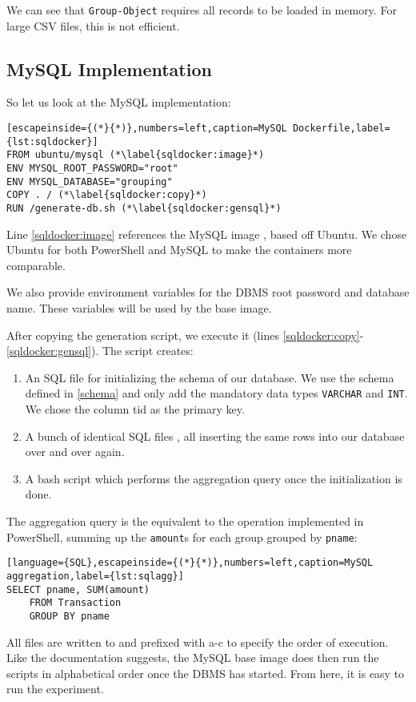 We can see that \verb+Group-Object+ requires all records
to be loaded in memory. For large \gls{CSV} files, this is not efficient.

\subsection{MySQL Implementation}

So let us look at the \gls{MySQL} implementation:

\begin{lstlisting}[escapeinside={(*}{*)},numbers=left,caption=MySQL Dockerfile,label={lst:sqldocker}]
FROM ubuntu/mysql (*\label{sqldocker:image}*)
ENV MYSQL_ROOT_PASSWORD="root"
ENV MYSQL_DATABASE="grouping"
COPY . / (*\label{sqldocker:copy}*)
RUN /generate-db.sh (*\label{sqldocker:gensql}*)
\end{lstlisting}
Line \ref{sqldocker:image} references the \gls{MySQL} image \cite{dockerMySQL},
based off Ubuntu. We chose Ubuntu for both \gls{PowerShell} and \gls{MySQL} to
make the containers more comparable.

We also provide environment variables for the \gls{DBMS} root password
and database name. These variables will be used by the base image.

After copying the generation script, we execute it
(lines \ref{sqldocker:copy}-\ref{sqldocker:gensql}).
The script creates:
\begin{enumerate}
    \item An SQL file  for initializing the schema of our database.
        We use the schema defined in \ref{schema} and only add
        the mandatory data types \verb+VARCHAR+ and \verb+INT+.
        We chose the column tid as the primary key.
    \item A bunch of identical SQL files ,
        all inserting the same
        rows into our database over and over again.
    \item A bash script  which performs the
        aggregation query once the initialization is done.
\end{enumerate}
The aggregation query is the equivalent to the operation implemented in \gls{PowerShell},
summing up the \verb+amount+s for each group grouped by \verb+pname+:
\begin{lstlisting}[language={SQL},escapeinside={(*}{*)},numbers=left,caption=MySQL aggregation,label={lst:sqlagg}]
SELECT pname, SUM(amount)
    FROM Transaction
    GROUP BY pname
\end{lstlisting}
All files are written to 
and prefixed with a-c to specify the order of execution.
Like the documentation suggests, the \gls{MySQL} base image does then
run the scripts in alphabetical order once the \gls{DBMS}
has started. From here, it is easy to run the experiment.

